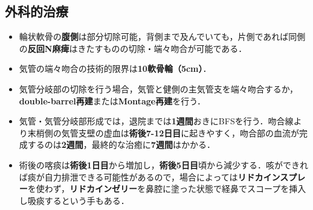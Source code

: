 \subsection{外科的治療}

\begin{itemize}

\item 輪状軟骨の\textbf{腹側}は部分切除可能，背側まで及んでいても，片側であれば同側の\textbf{反回N麻痺}はきたすものの切除・端々吻合が可能である．
\item 気管の端々吻合の技術的限界は\textbf{10軟骨輪（5cm）}．
\item 気管分岐部の切除を行う場合，気管と健側の主気管支を端々吻合するか，\textbf{double-barrel再建}または\textbf{Montage再建}を行う．
\item 気管・気管分岐部形成では，退院までは\textbf{1週間}おきにBFSを行う．吻合線より末梢側の気管支壁の虚血は\textbf{術後7-12日目}に起きやすく，吻合部の血流が完成するのは\textbf{2週間}，最終的な治癒に\textbf{7週間}はかかる．
\item 術後の喀痰は\textbf{術後1日目}から増加し，\textbf{術後5日目}頃から減少する．咳ができれば痰が自力排泄できる可能性があるので，場合によっては\textbf{リドカインスプレー}を使わず，\textbf{リドカインゼリー}を鼻腔に塗った状態で経鼻でスコープを挿入し吸痰するという手もある．

\end{itemize}



